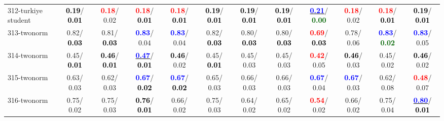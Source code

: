 \begin{table}[h]
\begin{center}
{\begin{tabular}{lc|c|c|c|c|c|c|c|c|c|c}
312-turkiye student & \textcolor{black}{\textbf{  0.19}}/\textcolor{black}{\textbf{  0.01}} & \textcolor{red}{\textbf{  0.18}}/  0.02 & \textcolor{red}{\textbf{  0.18}}/\textcolor{black}{\textbf{  0.01}} & \textcolor{red}{\textbf{  0.18}}/\textcolor{black}{\textbf{  0.01}} & \textcolor{black}{\textbf{  0.19}}/\textcolor{black}{\textbf{  0.01}} & \textcolor{black}{\textbf{  0.19}}/\textcolor{black}{\textbf{  0.01}} & \textcolor{black}{\textbf{  0.19}}/\textcolor{black}{\textbf{  0.01}} & \underline{\textcolor{blue}{\textbf{  0.21}}}/\textcolor{darkgreen}{\textbf{  0.00}} & \textcolor{red}{\textbf{  0.18}}/  0.02 & \textcolor{red}{\textbf{  0.18}}/\textcolor{black}{\textbf{  0.01}} & \textcolor{black}{\textbf{  0.19}}/\textcolor{black}{\textbf{  0.01}} \\
313-twonorm &   0.82/\textcolor{black}{\textbf{  0.03}} &   0.81/\textcolor{black}{\textbf{  0.03}} & \textcolor{blue}{\textbf{  0.83}}/  0.04 & \textcolor{blue}{\textbf{  0.83}}/  0.04 &   0.82/\textcolor{black}{\textbf{  0.03}} &   0.80/\textcolor{black}{\textbf{  0.03}} &   0.80/\textcolor{black}{\textbf{  0.03}} & \textcolor{red}{\textbf{  0.69}}/\textcolor{black}{\textbf{  0.03}} &   0.78/  0.06 & \textcolor{blue}{\textbf{  0.83}}/\textcolor{darkgreen}{\textbf{  0.02}} & \textcolor{blue}{\textbf{  0.83}}/  0.05 \\
314-twonorm &   0.45/\textcolor{black}{\textbf{  0.01}} & \textcolor{black}{\textbf{  0.46}}/\textcolor{black}{\textbf{  0.01}} & \underline{\textcolor{blue}{\textbf{  0.47}}}/\textcolor{black}{\textbf{  0.01}} & \textcolor{black}{\textbf{  0.46}}/  0.02 &   0.45/\textcolor{black}{\textbf{  0.01}} &   0.45/  0.03 &   0.45/  0.03 & \textcolor{red}{\textbf{  0.42}}/  0.05 & \textcolor{black}{\textbf{  0.46}}/  0.03 &   0.45/  0.02 & \textcolor{black}{\textbf{  0.46}}/  0.02 \\
315-twonorm &   0.63/  0.03 &   0.62/  0.03 & \textcolor{blue}{\textbf{  0.67}}/\textcolor{black}{\textbf{  0.02}} & \textcolor{blue}{\textbf{  0.67}}/\textcolor{black}{\textbf{  0.02}} &   0.65/  0.03 &   0.66/  0.03 &   0.66/  0.03 & \textcolor{blue}{\textbf{  0.67}}/  0.04 & \textcolor{blue}{\textbf{  0.67}}/  0.03 &   0.62/  0.08 & \textcolor{red}{\textbf{  0.48}}/  0.07 \\
316-twonorm &   0.75/  0.02 &   0.75/  0.03 & \textcolor{black}{\textbf{  0.76}}/\textcolor{black}{\textbf{  0.01}} &   0.66/  0.02 &   0.75/  0.03 &   0.64/  0.02 &   0.65/  0.02 & \textcolor{red}{\textbf{  0.54}}/  0.02 &   0.66/  0.02 &   0.75/  0.04 & \underline{\textcolor{blue}{\textbf{  0.80}}}/\textcolor{black}{\textbf{  0.01}} \\ \hline

\end{tabular}}
\end{center}
\end{table}
